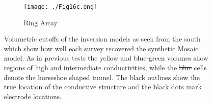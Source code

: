 \documentclass[preprint,authoryear,12pt]{elsarticle}
\providecommand{\DIFaddtex}[1]{{\protect\color{blue}\uwave{#1}}} %
\providecommand{\DIFdeltex}[1]{{\protect\color{red}\sout{#1}}}                      %
\providecommand{\DIFaddFL}[1]{\DIFadd{#1}} %
\providecommand{\DIFdelFL}[1]{\DIFdel{#1}} %
\providecommand{\DIFaddbeginFL}{} %
\providecommand{\DIFaddendFL}{} %
\providecommand{\DIFdelbeginFL}{} %
\providecommand{\DIFdelendFL}{} %
\providecommand{\DIFadd}[1]{\texorpdfstring{\DIFaddtex{#1}}{#1}} %
\providecommand{\DIFdel}[1]{\texorpdfstring{\DIFdeltex{#1}}{}} %
\begin{document}
\begin{figure}[htp]{}
\begin{center}
      \begin{subfigure}{0.48\linewidth}
         \label{fig:SynthMosaic_Horseshoe_Ring_South}
         \DIFdelbeginFL %
\DIFdelendFL \DIFaddbeginFL \texttt{[image: ./Fig16c.png]}
         \DIFaddendFL \caption{Ring Array}
      \end{subfigure}
      \vspace{0.2cm}
   \end{center}
\vspace{-0.4cm}
\caption{Volumetric cutoffs of the inversion models as seen from the south which show how well each survey recovered the synthetic Mosaic model. As in previous tests the yellow and blue-green volumes show regions of high and intermediate conductivities, while the \DIFdelbeginFL \DIFdelFL{blue }\DIFdelendFL \DIFaddbeginFL \DIFaddFL{dark purple }\DIFaddendFL cells denote the horseshoe shaped tunnel. The black outlines show the true location of the conductive structure and the black dots mark electrode locations.}
\label{fig:Horseshoe_SynthMosaic2_Isosurfaces_South}
\end{figure}
\end{document}
